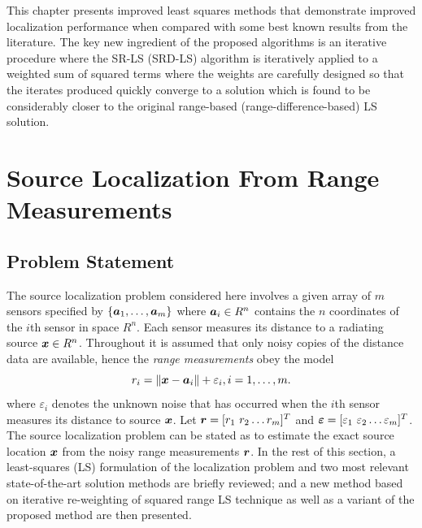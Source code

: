 This chapter presents improved least squares methods that demonstrate improved localization performance when compared with some best known results from the literature. The key new ingredient of the proposed algorithms is an iterative procedure where the SR-LS (SRD-LS) algorithm is iteratively applied to a weighted sum of squared terms where the weights are carefully designed so that the iterates produced quickly converge to a solution which is found to be considerably closer to the original range-based (range-difference-based) LS solution. %



\section{Source Localization From Range Measurements}%
\subsection{Problem Statement}%


The source localization problem considered here involves a given array of $m$ sensors specified by $\{\mbox{\boldmath$a$}_1,\ldots, \mbox{\boldmath$a$}_m\}$ where $\mbox{\boldmath$a$}_i\in R^n$  contains the $n$ coordinates of the $i$th sensor in space $R^n$. Each sensor measures its distance to a radiating source $\mbox{\boldmath$x$}\in R^n$. Throughout it is assumed that only noisy copies of the distance data are available, hence the \textit{range measurements} obey the model
\begin{equation} \label{eq:3.1}
\setcounter{equation}{1}
r_i = \|{\Bx} - {\Ba}_i\| + \varepsilon_i, i = 1,\ldots , m.
\end{equation}                                                                                                     	where $\varepsilon_i$ denotes the unknown noise that has occurred when the $i$th sensor measures its distance to source $\mbox{\boldmath$x$}$. Let $\mbox{\boldmath$r$}=[r_1 \ r_2 \ldots r_m]^T$ and $\mbox{\boldmath${\varepsilon}$}=[\varepsilon_1 \ \varepsilon_2 \ldots \varepsilon_m]^T$. The source localization problem can be stated as to estimate the exact source location $\mbox{\boldmath$x$}$ from the noisy range measurements $\mbox{\boldmath$r$}$. In the rest of this section, a least-squares (LS) formulation of the localization problem and two most relevant state-of-the-art solution methods are briefly reviewed; and a new method based on iterative re-weighting of squared range LS technique as well as a variant of the proposed method are then presented. %

